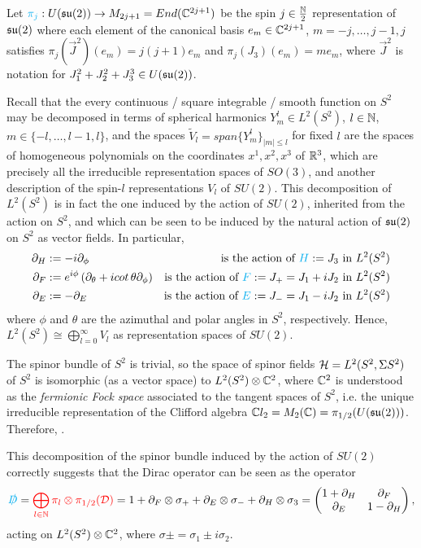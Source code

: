 \lin

Let $\textcolor{cyan}{\pi_j}: U(\mathfrak{su}(2)) \to M_{2j+1} = End(\mathbb{C}^{2j+1})$ be the spin $j \in \frac{\mathbb{N}}{2}$ representation of $\mathfrak{su}(2)$ where each element of the canonical basis $e_m \in \mathbb{C}^{2j+1}$, $m = -j, \dots, j-1, j$ satisfies $\pi_j(\vec J^2)(e_m) = j(j+1) e_m$ and $\pi_j(J_3)(e_m) = m e_m$, where $\vec J^2$ is notation for $J_1^2 + J_2^2 + J_3^3 \in U(\mathfrak{su}(2))$.

Recall that the every continuous / square integrable / smooth function on $S^2$ may be decomposed in terms of spherical harmonics $Y^l_m \in L^2(S^2)$, $l \in \mathbb{N}$, $m \in \{-l, \dots, l-1, l\}$, and the spaces $\tilde V_l = span\{Y^l_m\}_{|m| \leq l}$ for fixed $l$ are the spaces of homogeneous polynomials on the coordinates $x^1, x^2, x^3$ of $\mathbb{R}^3$, which are precisely all the irreducible representation spaces of $SO(3)$, and another description of the spin-$l$ representations $V_l$ of $SU(2)$. 
This decomposition of $L^2(S^2)$ is in fact the one induced by the action of $SU(2)$, inherited from the action on $S^2$, and which can be seen to be induced by the natural action of $\mathfrak{su}(2)$ on $S^2$ as vector fields. In particular, 
\begin{align}
    \partial_H &:= - i \partial_\phi & \text{is the action of $\lbtext{H} := J_3$ in $L^2(S^2)$} \\
    \partial_F &:= e^{i\phi} \left( \partial_\theta + i cot\,\theta \partial_\phi \right) &\text{is the action of $\lbtext{F} := J_+ = J_1 + i J_2$ in $L^2(S^2)$}\\
    \partial_E &:= - \partial_E &\text{is the action of $\lbtext{E} := J_- = J_1 - i J_2$ in $L^2(S^2)$}
\end{align} where $\phi$ and $\theta$ are the azimuthal and polar angles in $S^2$, respectively.
Hence, $L^2(S^2) \cong \bigoplus_{l = 0}^\infty V_l$ as representation spaces of $SU(2)$.

The spinor bundle of $S^2$ is trivial, so the space of spinor fields $\mathcal H = L^2(S^2, \Sigma S^2)$ of $S^2$ is isomorphic (as a vector space) to $L^2(S^2) \otimes \mathbb{C}^2$, where $\mathbb{C}^2$ is understood as the \textit{fermionic Fock space} associated to the tangent spaces of $S^2$, i.e. the unique irreducible representation of the Clifford algebra $\mathbb{C} l_2 = M_2(\mathbb{C}) = \pi_{1/2}(U(\mathfrak{su}(2)))$. Therefore, .

\lin

This decomposition of the spinor bundle induced by the action of $SU(2)$ correctly suggests that the Dirac operator can be seen as the operator
\begin{equation}
    \textcolor{cyan}{\slashed D} = \textcolor{red}{ \bigoplus_{l\in \mathbb{N}} \pi_l  \otimes \pi_{1/2}(\mathcal D)} = 1 + \partial_F \otimes \sigma_+ + \partial_E \otimes \sigma_- + \partial_H \otimes \sigma_3 = \begin{pmatrix} 1 + \partial_H & \partial_F \\ \partial_E & 1 - \partial_H\end{pmatrix} ,
\end{equation} acting on $L^2(S^2)\otimes \mathbb{C}^2$, where $\sigma \pm = \sigma_1 \pm i \sigma_2$.

